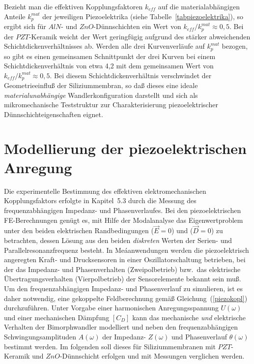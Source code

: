 Bezieht man die effektiven
Kopplungsfaktoren $k_{eff}$ auf die materialabhängigen Anteile
$k^{mat}_{p}$ der jeweiligen Piezoelektrika
(siehe Tabelle~\ref{tabpiezoelektrika}), so ergibt sich für $AlN$-
und $ZnO$-Dünnschichten ein Wert von $k_{eff}/k^{mat}_{p} \approx 0,5$.
Bei der $PZT$-Keramik weicht der Wert geringfügig aufgrund des stärker
abweichenden Schichtdickenverhältnisses ab. Werden alle drei Kurvenverläufe
auf $k^{mat}_{p}$ bezogen, so gibt es einen gemeinsamen Schnittpunkt
der drei Kurven bei einem Schichtdickenverhältnis von etwa 4,2 mit dem
gemeinsamen Wert von $k_{eff}/k^{mat}_{p} \approx 0,5$. Bei diesem
Schichtdickenverhältnis verschwindet der Geometrieeinfluß der
Siliziummembran, so daß dieses eine ideale {\em materialunabhängige}
Wandlerkonfigura\-tion darstellt und sich als mikromechanische Teststruktur
zur Charakterisierung piezoelektrischer Dünnschichteigenschaften eignet.\\
%


\section{Modellierung der piezoelektrischen Anregung}
\label{impedanz}

Die experimentelle Bestimmung des effektiven elektromechanischen
Kopplungsfaktors erfolgte in Kapitel~5.3 durch die Messung des
frequenzabhängigen Impedanz- und Phasenverlaufes. Bei den piezoelektrischen
FE-Berechnungen genügt es, mit Hilfe der Modal\-analyse das Eigenwertproblem
unter den beiden elektrischen Randbedingungen ($\vec E=0$)
und ($\vec D=0$) zu betrachten, dessen Lösung aus den beiden
{\em diskreten} Werten der Serien- und Parallelresonanzfrequenz besteht.
In Meáanwendungen werden die piezoelektrisch angeregten Kraft- und
Drucksensoren in einer Oszillatorschaltung betrieben, bei der das
Impedanz- und Phasenverhalten (Zweipolbetrieb) bzw.\ das elektrische
Übertragungsverhalten (Vierpolbetrieb) der Sensorelemente bekannt sein muß.
Um den frequenzabhängigen Impedanz- und Phasenverlauf zu simulieren, ist es
daher notwendig,
eine gekoppelte Feldberechnung gemäß Gleichung~(\ref{piezokopl})
durchzuführen. Unter Vorgabe einer harmonischen %
Anregungsspannung $U(\omega)$ und einer mechanischen Dämpfung $[C_{D}]$
kann das mechanische {\em und} elektrische Verhalten der
Bimorphwandler modelliert und neben den frequenzabhängigen
Schwingungsamplituden $A(\omega)$ der Impedanz- $Z(\omega)$ und
Phasenverlauf $\theta(\omega)$ bestimmt werden.
Im folgenden soll dieses für Siliziummembranen mit $PZT$-Keramik und
$ZnO$-Dünnschicht erfolgen und mit Messungen verglichen werden.\\



